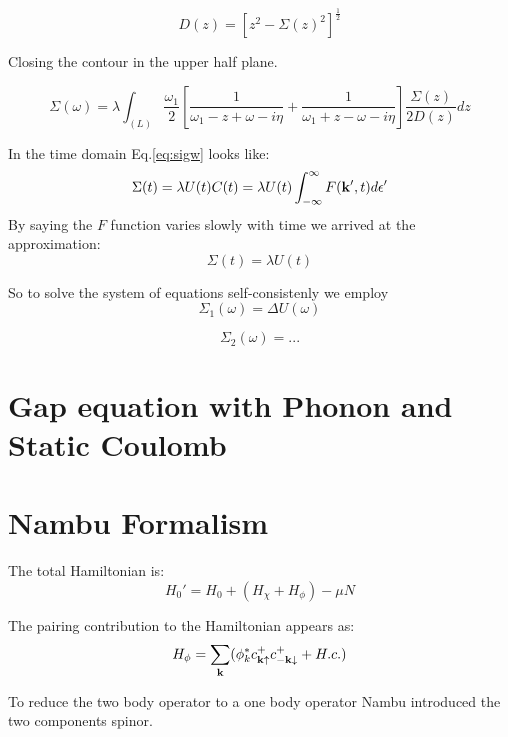 \begin{equation}
D(z) =  \left[z^{2} - \Sigma(z)^{2} \right]^{\frac{1}{2}}
\end{equation}

Closing the contour in the upper half plane.

\begin{equation}
\label{eq:sigw}
\Sigma(\omega) = \lambda \int_{(L)} \frac{\omega_{1}}{2} \left[ \frac{1}{\omega_{1} - z + \omega - i\eta} 
+ \frac{1}{\omega_{1} + z - \omega - i\eta} \right] \frac{\Sigma(z)}{2D(z)} dz
\end{equation}

In the time domain Eq.\ref{eq:sigw} looks like:
%
\begin{equation}
\Sigma(t) = \lambda U(t) C(t) = \lambda U(t) \int_{-\infty}^{\infty}F({\bf k}',t)d\epsilon' 
\end{equation}
%
By saying the $F$ function varies slowly with time we arrived at the approximation:
%
\begin{equation}
\Sigma(t) = \lambda U(t)
\end{equation}

So to solve the system of equations self-consistenly we employ
%
\begin{equation}
\Sigma_{1}(\omega) = \Delta U(\omega)
\end{equation}

\begin{equation}
\Sigma_{2}(\omega) = ...
\end{equation}


\section{Gap equation with Phonon and Static Coulomb}

\section{Nambu Formalism}
The total Hamiltonian is:
%
\begin{equation}
H_{0}'= H_{0} + (H_{\chi} + H_{\phi}) - \mu N
\end{equation}
%

The pairing contribution to the Hamiltonian appears as:
%
\begin{equation}
H_{\phi} = \sum_{{\bf k}}(\phi^{*}_{k}c^{+}_{{\bf k}\uparrow}c^{+}_{-{\bf k}\downarrow}  + H.c. )
\end{equation}
%

To reduce the two body operator to a one body operator Nambu introduced the two components spinor.

